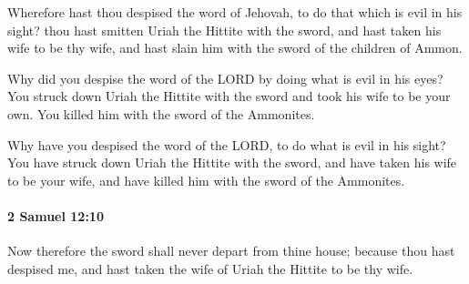 			\begin{versebox}
					\item[BHS] 
					\item[ASV] Wherefore hast thou despised the word of Jehovah, to do that which is evil in his sight? thou hast smitten Uriah the Hittite with the sword, and hast taken his wife to be thy wife, and hast slain him with the sword of the children of Ammon.
					\item[NIV] Why did you despise the word of the LORD by doing what is evil in his eyes? You struck down Uriah the Hittite with the sword and took his wife to be your own. You killed him with the sword of the Ammonites.
					\item[NRSV] Why have you despised the word of the LORD, to do what is evil in his sight? You have struck down Uriah the Hittite with the sword, and have taken his wife to be your wife, and have killed him with the sword of the Ammonites.
			\end{versebox}

		\paragraph{2 Samuel 12:10} %
			\label{2SAMUEL-12-10}

			Now therefore the sword shall never depart from thine house; because thou hast despised me, and hast taken the wife of Uriah the Hittite to be thy wife.

